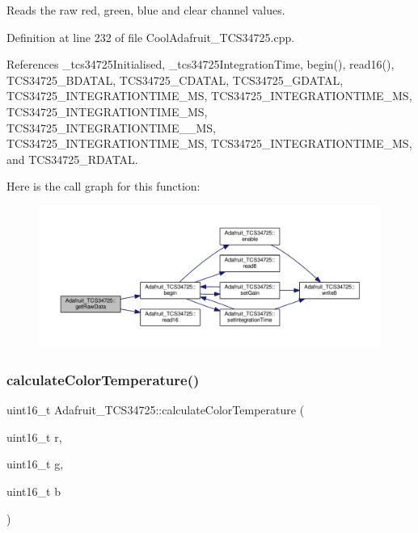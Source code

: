 Reads the raw red, green, blue and clear channel values. 



Definition at line 232 of file Cool\+Adafruit\+\_\+\+T\+C\+S34725.\+cpp.



References \+\_\+tcs34725\+Initialised, \+\_\+tcs34725\+Integration\+Time, begin(), read16(), T\+C\+S34725\+\_\+\+B\+D\+A\+T\+AL, T\+C\+S34725\+\_\+\+C\+D\+A\+T\+AL, T\+C\+S34725\+\_\+\+G\+D\+A\+T\+AL, T\+C\+S34725\+\_\+\+I\+N\+T\+E\+G\+R\+A\+T\+I\+O\+N\+T\+I\+M\+E\+\_\+MS, T\+C\+S34725\+\_\+\+I\+N\+T\+E\+G\+R\+A\+T\+I\+O\+N\+T\+I\+M\+E\+\_\+MS, T\+C\+S34725\+\_\+\+I\+N\+T\+E\+G\+R\+A\+T\+I\+O\+N\+T\+I\+M\+E\+\_\+MS, T\+C\+S34725\+\_\+\+I\+N\+T\+E\+G\+R\+A\+T\+I\+O\+N\+T\+I\+M\+E\+\_\+\_\+MS, T\+C\+S34725\+\_\+\+I\+N\+T\+E\+G\+R\+A\+T\+I\+O\+N\+T\+I\+M\+E\+\_\+MS, T\+C\+S34725\+\_\+\+I\+N\+T\+E\+G\+R\+A\+T\+I\+O\+N\+T\+I\+M\+E\+\_\+MS, and T\+C\+S34725\+\_\+\+R\+D\+A\+T\+AL.

Here is the call graph for this function\+:
\nopagebreak
\begin{figure}[H]
\begin{center}
\leavevmode
\includegraphics[width=350pt]{df/d54/class_adafruit___t_c_s34725_abd9946a9baab1e0c76248cfe1864ea27_cgraph}
\end{center}
\end{figure}
\mbox{\label{class_adafruit___t_c_s34725_a9c6c7ab8a84a47a65ff04a125bcfee92}} 
\subsubsection{\texorpdfstring{calculate\+Color\+Temperature()}{calculateColorTemperature()}}
{\footnotesize\ttfamily uint16\+\_\+t Adafruit\+\_\+\+T\+C\+S34725\+::calculate\+Color\+Temperature (\begin{DoxyParamCaption}\item[{uint16\+\_\+t}]{r,  }\item[{uint16\+\_\+t}]{g,  }\item[{uint16\+\_\+t}]{b }\end{DoxyParamCaption})}



